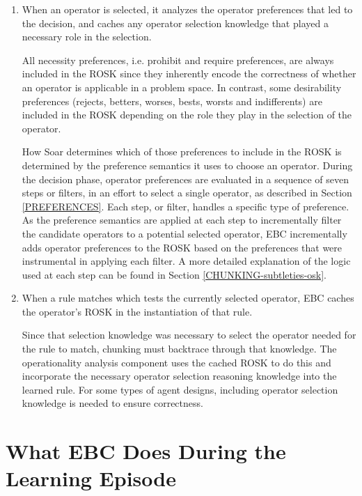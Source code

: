 \begin{enumerate}
	\item When an operator is selected, it analyzes the operator preferences that led to the decision, and caches any operator selection knowledge that played a necessary role in the selection. 

	All necessity preferences, i.e. prohibit and require preferences, are always included in the ROSK since they inherently encode the correctness of whether an operator is applicable in a problem space. In contrast, some desirability preferences (rejects, betters, worses, bests, worsts and indifferents) are included in the ROSK depending on the role they play in the selection of the operator. 

	How Soar determines which of those preferences to include in the ROSK is determined by the preference semantics it uses to choose an operator. During the decision phase, operator preferences are evaluated in a sequence of seven steps or filters, in an effort to select a single operator, as described in Section \ref{PREFERENCES}.  Each step, or filter, handles a specific type of preference.  As the preference semantics are applied at each step to incrementally filter the candidate operators to a potential selected operator, EBC incrementally adds operator preferences to the ROSK based on the preferences that were instrumental in applying each filter.  A more detailed explanation of the logic used at each step can be found in Section \ref{CHUNKING-subtleties-osk}.

	\item When a rule matches which tests the currently selected operator, EBC caches the operator's ROSK in the instantiation of that rule.  

	Since that selection knowledge was necessary to select the operator needed for the rule to match, chunking must backtrace through that knowledge.  The operationality analysis component uses the cached ROSK to do this and incorporate the necessary operator selection reasoning knowledge into the learned rule.  For some types of agent designs, including operator selection knowledge is needed to ensure correctness.
\end{enumerate}


\section{What EBC Does During the Learning Episode}
\label{CHUNKING-during}

